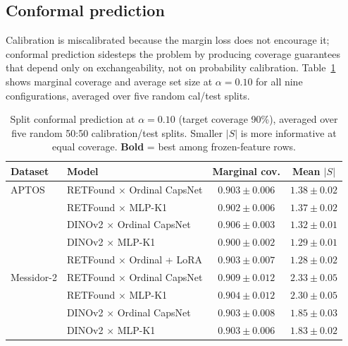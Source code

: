 \documentclass[journal]{IEEEtran}
\begin{document}
\subsection{Conformal prediction}
\label{sec:conformal-results}
\label{sec:conformal}

Calibration is miscalibrated because the margin loss does not encourage it; conformal prediction sidesteps the problem by producing coverage guarantees that depend only on exchangeability, not on probability calibration. Table~\ref{tab:conformal} shows marginal coverage and average set size at $\alpha = 0.10$ for all nine configurations, averaged over five random cal/test splits.

\begin{table}[!t]
    \caption{Split conformal prediction at $\alpha = 0.10$ (target coverage 90\%), averaged over five random 50:50 calibration/test splits. Smaller $|S|$ is more informative at equal coverage. \textbf{Bold} = best among frozen-feature rows.}
    \label{tab:conformal}
    \centering
    \footnotesize
    \begin{tabular}{@{}llcc@{}}
        \toprule
        Dataset    & Model                             & Marginal cov.     & Mean $|S|$               \\
        \midrule
        APTOS      & RETFound $\times$ Ordinal CapsNet & $0.903 \pm 0.006$ & $1.38 \pm 0.02$           \\
                   & RETFound $\times$ MLP-K1          & $0.902 \pm 0.006$ & $1.37 \pm 0.02$           \\
                   & DINOv2 $\times$ Ordinal CapsNet   & $0.906 \pm 0.003$ & $1.32 \pm 0.01$           \\
                   & DINOv2 $\times$ MLP-K1            & $0.900 \pm 0.002$ & $\mathbf{1.29 \pm 0.01}$  \\
                   & RETFound $\times$ Ordinal + LoRA  & $0.903 \pm 0.007$ & $1.28 \pm 0.02$           \\
        \midrule
        Messidor-2 & RETFound $\times$ Ordinal CapsNet & $0.909 \pm 0.012$ & $2.33 \pm 0.05$           \\
                   & RETFound $\times$ MLP-K1          & $0.904 \pm 0.012$ & $2.30 \pm 0.05$           \\
                   & DINOv2 $\times$ Ordinal CapsNet   & $0.903 \pm 0.008$ & $1.85 \pm 0.03$           \\
                   & DINOv2 $\times$ MLP-K1            & $0.903 \pm 0.006$ & $\mathbf{1.83 \pm 0.02}$  \\
        \bottomrule
    \end{tabular}
\end{table}
\end{document}
